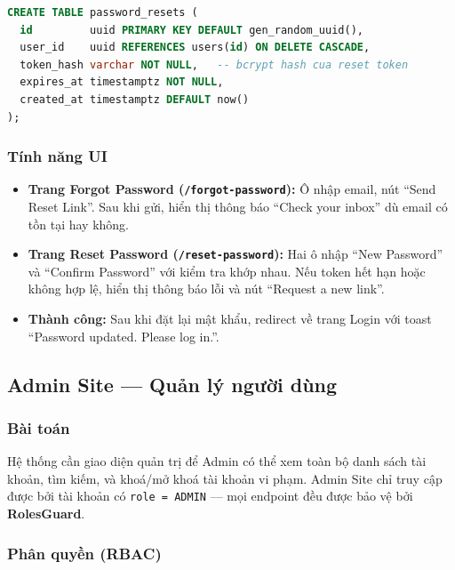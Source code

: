 \documentclass[12pt,a4paper]{article}
\begin{document}
\begin{lstlisting}[language=SQL]
CREATE TABLE password_resets (
  id         uuid PRIMARY KEY DEFAULT gen_random_uuid(),
  user_id    uuid REFERENCES users(id) ON DELETE CASCADE,
  token_hash varchar NOT NULL,   -- bcrypt hash cua reset token
  expires_at timestamptz NOT NULL,
  created_at timestamptz DEFAULT now()
);
\end{lstlisting}

\subsubsection{Tính năng UI}

\begin{itemize}
  \item \textbf{Trang Forgot Password (\texttt{/forgot-password}):}
        Ô nhập email, nút ``Send Reset Link''. Sau khi gửi, hiển thị
        thông báo ``Check your inbox'' dù email có tồn tại hay không.
  \item \textbf{Trang Reset Password (\texttt{/reset-password}):}
        Hai ô nhập ``New Password'' và ``Confirm Password'' với kiểm tra
        khớp nhau. Nếu token hết hạn hoặc không hợp lệ, hiển thị thông
        báo lỗi và nút ``Request a new link''.
  \item \textbf{Thành công:} Sau khi đặt lại mật khẩu, redirect về trang
        Login với toast ``Password updated. Please log in.''.
\end{itemize}

\subsection{Admin Site --- Quản lý người dùng}

\subsubsection{Bài toán}

Hệ thống cần giao diện quản trị để Admin có thể xem toàn bộ danh sách
tài khoản, tìm kiếm, và khoá/mở khoá tài khoản vi phạm. Admin Site chỉ
truy cập được bởi tài khoản có \texttt{role = ADMIN} --- mọi endpoint đều
được bảo vệ bởi \textbf{RolesGuard}.

\subsubsection{Phân quyền (RBAC)}
\end{document}

